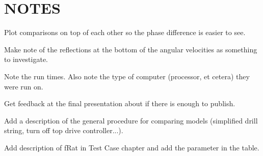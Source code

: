 \documentclass{lecnpcreport}
\begin{document}


\frontmatter{}


\tableofcontents{}
\listoffigures{}
\listoftables{}



\mainmatter{}



\chapter{NOTES}
\begin{bulletedlist}
	\item Plot comparisons on top of each other so the phase difference is easier to see.
	\item Make note of the reflections at the bottom of the angular velocities as something to investigate.
	\item Note the run times.  Also note the type of computer (processor, et cetera) they were run on.
	\item Get feedback at the final presentation about if there is enough to publish.
	\item Add a description of the general procedure for comparing models (simplified drill string, turn off top drive controller...).
    \item Add description of fRat in Test Case chapter and add the parameter in the table.
\end{bulletedlist}








\appendix{}




\end{document}

